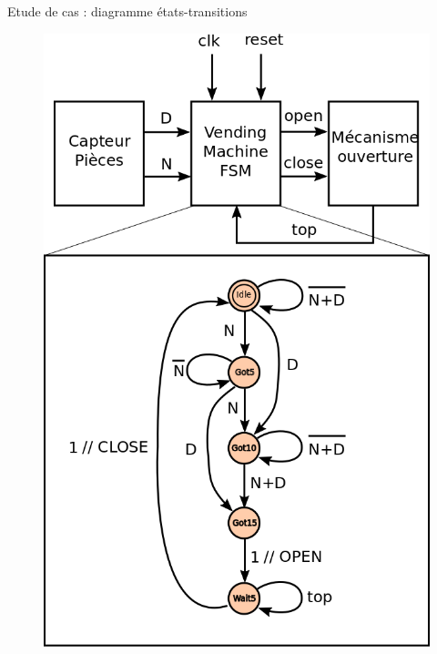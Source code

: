 \documentclass[xcolor=table]{beamer}
\begin{document}
\begin{frame}{Etude de cas : diagramme états-transitions}
  \begin{figure}[h]
    \centering
    \includegraphics[scale=0.2]{../../POLY/figures/vending_machine.png}
    \label{fig:vending_machine}
  \end{figure}
\end{frame}
\end{document}
